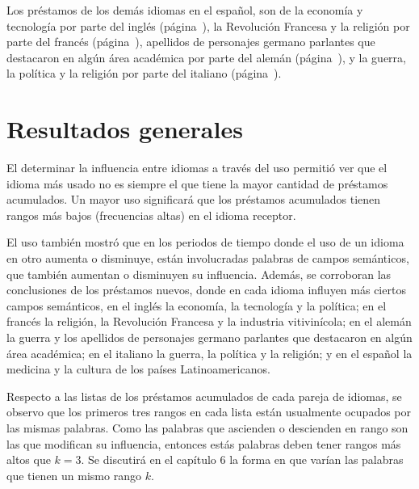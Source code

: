 Los préstamos de los demás idiomas en el español, son de la economía y tecnología por parte del inglés (página~\pageref{EN-D}), la Revolución Francesa y la religión por parte del francés (página~\pageref{FR-D}), apellidos de personajes germano parlantes que destacaron en algún área académica  por parte del alemán (página~\pageref{GE-D}), y la guerra, la política y la religión por parte del italiano (página~\pageref{IT-D}).  



\label{D-SP}




\section{Resultados generales} %


El determinar la influencia entre idiomas a través del uso permitió ver  que el idioma más usado no es siempre el que tiene la mayor cantidad de préstamos acumulados.  Un mayor uso significará que los préstamos acumulados tienen rangos más bajos (frecuencias altas) en el idioma receptor.

El uso también mostró que en los periodos de tiempo donde el uso de un idioma en otro aumenta o disminuye, están involucradas palabras de campos semánticos, que también aumentan o disminuyen su influencia.  Además, se corroboran las conclusiones de los préstamos nuevos, donde en cada idioma influyen más ciertos campos semánticos, en el inglés la economía, la tecnología y la política; en el francés la religión, la Revolución Francesa y la industria vitivinícola; en el alemán la guerra y los apellidos de personajes germano parlantes que destacaron en algún área académica; en el italiano la guerra, la política y la religión; y en el español la medicina y la cultura de los países Latinoamericanos.

Respecto a las listas de los préstamos acumulados de cada pareja de idiomas, se observo que los primeros tres rangos en cada lista están usualmente ocupados por las mismas palabras. Como las palabras que ascienden o descienden en rango son las que modifican su influencia, entonces estás palabras deben tener rangos más altos que $k=3$. Se discutirá en el capítulo 6 la forma en que varían las palabras que tienen un mismo rango $k$.



